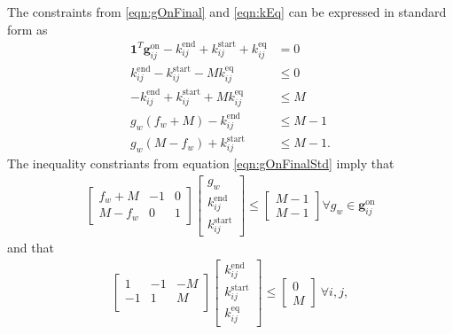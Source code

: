 The constraints from \eqref{eqn:gOnFinal} and \eqref{eqn:kEq} can be expressed in standard form as 
\begin{equation} \label{eqn:gOnFinalStd}\begin{aligned}
	\mathbf{1}^T\mathbf{g}_{ij}^{\text{on}} - k_{ij}^{\text{end}} + k_{ij}^{\text{start}} + k_{ij}^{\text{eq}} &=  0 \\
	k_{ij}^{\text{end}} - k_{ij}^{\text{start}} - M k_{ij}^{\text{eq}} &\le 0 \\
	-k_{ij}^{\text{end}} + k_{ij}^{\text{start}} + M k_{ij}^{\text{eq}} &\le M \\
	g_w\left (f_w + M \right) - k_{ij}^{\text{end}} &\le M - 1 \\
	g_w\left (M - f_w\right) + k_{ij}^{\text{start}} &\le M - 1.
\end{aligned}\end{equation}
The inequality constriants from equation \ref{eqn:gOnFinalStd} imply that
\begin{equation} \label{eqn:gOnFinalPart1}\begin{aligned}
	\begin{bmatrix}f_w + M & -1 & 0\\
		       M - f_w & 0 & 1 
	\end{bmatrix} 
	\begin{bmatrix}g_w                 \\
		       k_{ij}^{\text{end}} \\ 
		       k_{ij}^{\text{start}}
	\end{bmatrix} \le
	\begin{bmatrix} M - 1 \\
	                M - 1 
	\end{bmatrix} \forall g_w \in \mathbf{g}_{ij}^{\text{on}}
\end{aligned}\end{equation} 
and that
\begin{equation} \label{eqn:kEqStd}\begin{aligned}
	\begin{bmatrix}1 & -1 & -M \\
		       -1 & 1 & M  \\
		       \end{bmatrix} \begin{bmatrix}k_{ij}^{\text{end}} \\ k_{ij}^{\text{start}} \\ k_{ij}^{\text{eq}} \end{bmatrix} \le \begin{bmatrix} 0 \\ M\end{bmatrix} \ \forall i,j,
\end{aligned} \end{equation}
